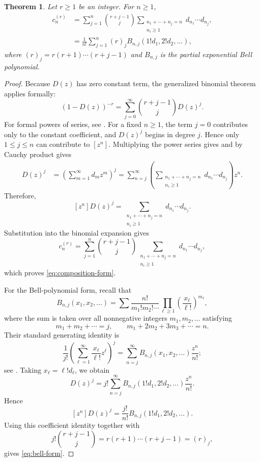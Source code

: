 \documentclass[11pt,reqno]{amsart}
\numberwithin{equation}{section}
\newtheorem{theorem}{Theorem}[section]
\theoremstyle{definition}
\theoremstyle{remark}
\newcommand{\poch}[2]{\left(#1\right)_{#2}}
\begin{document}
\begin{theorem}
\label{thm:nonrecursive}
Let \(r\geq1\) be an integer.  For \(n\geq1\),
\begin{align}
 c_n^{(r)}
 &=
 \sum_{j=1}^{n}\binom{r+j-1}{j}
 \sum_{\substack{n_1+\cdots+n_j=n\\n_i\geq1}}
 d_{n_1}\cdots d_{n_j}, \label{eq:composition-form}\\
 &=
 \frac1{n!}\sum_{j=1}^{n}
 \poch{r}{j}
 B_{n,j}(1!d_1,2!d_2,\ldots), \label{eq:bell-form}
\end{align}
where \(\poch{r}{j}=r(r+1)\cdots(r+j-1)\) and \(B_{n,j}\) is the
partial exponential Bell polynomial.
\end{theorem}
\begin{proof}
Because \(D(z)\) has zero constant term, the generalized binomial
theorem applies formally:
\[
 (1-D(z))^{-r}
 =
 \sum_{j=0}^{\infty}
 \binom{r+j-1}{j}D(z)^j.
\]
For formal powers of series, see
\cite[Ch.~I, \S1.12; Ch.~III, \S3.5]{Comtet1974}.
For a fixed \(n\geq1\), the term \(j=0\) contributes only to the
constant coefficient, and \(D(z)^j\) begins in degree \(j\).  Hence
only \(1\leq j\leq n\) can contribute to \([z^n]\).
Multiplying the power series gives and by Cauchy product gives
\[
 \begin{aligned}
 D(z)^j
 &=
 \left(\sum_{m=1}^{\infty}d_mz^m\right)^j=
 \sum_{n=j}^{\infty}
 \left(
 \sum_{\substack{n_1+\cdots+n_j=n\\n_i\geq1}}
 d_{n_1}\cdots d_{n_j}
 \right)z^n.
 \end{aligned}
\]
Therefore,
\[
 [z^n]D(z)^j
 =
 \sum_{\substack{n_1+\cdots+n_j=n\\n_i\geq1}}
 d_{n_1}\cdots d_{n_j}.
\]
Substitution into the binomial expansion gives
\[
 c_n^{(r)}
 =
 \sum_{j=1}^{n}
 \binom{r+j-1}{j}
 \sum_{\substack{n_1+\cdots+n_j=n\\n_i\geq1}}
 d_{n_1}\cdots d_{n_j},
\]
which proves \eqref{eq:composition-form}.

For the Bell-polynomial form, recall that
\[
 B_{n,j}(x_1,x_2,\ldots)
 =
 \sum
 \frac{n!}{m_1!m_2!\cdots}
 \prod_{\ell\geq1}
 \left(\frac{x_\ell}{\ell!}\right)^{m_\ell},
\]
where the sum is taken over all nonnegative integers
\(m_1,m_2,\ldots\) satisfying
\[
 m_1+m_2+\cdots=j,
 \qquad
 m_1+2m_2+3m_3+\cdots=n.
\]
Their standard generating identity is
\[
 \frac1{j!}
 \left(
 \sum_{\ell=1}^{\infty}
 \frac{x_\ell}{\ell!}z^\ell
 \right)^j
 =
 \sum_{n=j}^{\infty}
 B_{n,j}(x_1,x_2,\ldots)\frac{z^n}{n!};
\]
see \cite[Ch.~III, Eq.~(3a')]{Comtet1974}.
Taking \(x_\ell=\ell!d_\ell\), we obtain
\[
 D(z)^j
 =
 j!\sum_{n=j}^{\infty}
 B_{n,j}(1!d_1,2!d_2,\ldots)\frac{z^n}{n!}.
\]
Hence
\[
 [z^n]D(z)^j
 =
 \frac{j!}{n!}
 B_{n,j}(1!d_1,2!d_2,\ldots).
\]
Using this coefficient identity together with
\[
 j!\binom{r+j-1}{j}
 =
 r(r+1)\cdots(r+j-1)
 =
 \poch{r}{j},
\]
gives \eqref{eq:bell-form}.
\end{proof}
\end{document}
